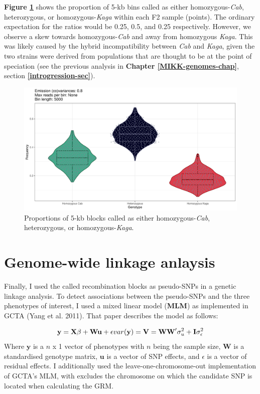 \documentclass[
]{book}
\begin{document}
\textbf{Figure \ref{fig:prop-sites-total}} shows the proportion of 5-kb bins called as either homozygous-\emph{Cab}, heterozygous, or homozygous-\emph{Kaga} within each F2 sample (points). The ordinary expectation for the ratios would be 0.25, 0.5, and 0.25 respectively. However, we observe a skew towards homozygous-\emph{Cab} and away from homozygous \emph{Kaga}. This was likely caused by the hybrid incompatibility between \emph{Cab} and \emph{Kaga}, given the two strains were derived from populations that are thought to be at the point of speciation (see the previous analysis in \textbf{Chapter \ref{MIKK-genomes-chap}}, section \textbf{\ref{introgression-sec}}).



\begin{figure}
\includegraphics[width=1\linewidth]{figs/somites/prop_sites_total} \caption{Proportions of 5-kb blocks called as either homozygous-\emph{Cab}, heterozygous, or homozygous-\emph{Kaga}.}\label{fig:prop-sites-total}
\end{figure}

\hypertarget{somite-assoc-tests}{%
\section{Genome-wide linkage anlaysis}\label{somite-assoc-tests}}

Finally, I used the called recombination blocks as pseudo-SNPs in a genetic linkage analysis. To detect associations between the pseudo-SNPs and the three phenotypes of interest, I used a mixed linear model (\textbf{MLM}) as implemented in GCTA (Yang et al. 2011). That paper describes the model as follows:

\[
\textbf{y} = \textbf{X}\beta + \textbf{Wu} + \epsilon \\
var(\textbf{y}) = \textbf{V} = \textbf{WW}'\sigma^2_{u} + \textbf{I}\sigma_{\epsilon}^2
\]
Where \(\textbf{y}\) is a \(n\) x 1 vector of phenotypes with \(n\) being the sample size, \(\textbf{W}\) is a standardised genotype matrix, \(\textbf{u}\) is a vector of SNP effects, and \(\epsilon\) is a vector of residual effects. I additionally used the leave-one-chromosome-out implementation of GCTA's MLM, with excludes the chromosome on which the candidate SNP is located when calculating the GRM.
\end{document}
